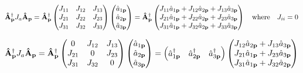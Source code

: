 \documentclass{article}
\begin{document}
\[\vb{\hat{A}}^\dagger_{\vb{p}}J_a\vb{\hat{A}}_{\vb{p}}=\vb{\hat{A}}^\dagger_{\vb{p}}\begin{pmatrix}
    J_{11} & J_{12} & J_{13} \\
    J_{21} & J_{22} & J_{23} \\
    J_{31} & J_{32} & J_{33} \\
  \end{pmatrix}\begin{pmatrix}
    \hat{a}_{1\vb{p}} \\
    \hat{a}_{2\vb{p}} \\
    \hat{a}_{3\vb{p}} \\
  \end{pmatrix}=\vb{\hat{A}}^\dagger_{\vb{p}}\begin{pmatrix}
    J_{11}\hat{a}_{1\vb{p}} + J_{12}\hat{a}_{2\vb{p}} + J_{13}\hat{a}_{3\vb{p}} \\
    J_{21}\hat{a}_{1\vb{p}} + J_{22}\hat{a}_{2\vb{p}} + J_{23}\hat{a}_{3\vb{p}} \\
    J_{31}\hat{a}_{1\vb{p}} + J_{32}\hat{a}_{2\vb{p}} + J_{33}\hat{a}_{3\vb{p}} \\
  \end{pmatrix}\qq{where} J_{ii}=0\]

\[\vb{\hat{A}}^\dagger_{\vb{p}}J_a\vb{\hat{A}}_{\vb{p}}=\vb{\hat{A}}^\dagger_{\vb{p}}\begin{pmatrix}
    0      & J_{12} & J_{13} \\
    J_{21} & 0      & J_{23} \\
    J_{31} & J_{32} & 0      \\
  \end{pmatrix}\begin{pmatrix}
    \hat{a}_{1\vb{p}} \\
    \hat{a}_{2\vb{p}} \\
    \hat{a}_{3\vb{p}} \\
  \end{pmatrix}=\begin{pmatrix}
    \hat{a}^\dagger_{1\vb{p}} &
    \hat{a}^\dagger_{2\vb{p}} &
    \hat{a}^\dagger_{3\vb{p}}
  \end{pmatrix}\begin{pmatrix}
    J_{12}\hat{a}_{2\vb{p}} + J_{13}\hat{a}_{3\vb{p}} \\
    J_{21}\hat{a}_{1\vb{p}} + J_{23}\hat{a}_{3\vb{p}} \\
    J_{31}\hat{a}_{1\vb{p}} + J_{32}\hat{a}_{2\vb{p}} \\
  \end{pmatrix}\]
\end{document}
